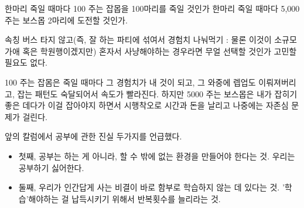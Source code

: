 한마리 죽일 때마다 100 주는 잡몹을 100마리를 죽일 것인가
한마리 죽일 때마다 5,000 주는 보스몹 2마리에 도전할 것인가.
\vspace{5mm}

속칭 버스 타지 않고(즉, 잘 하는 파티에 섞여서 경험치 나눠먹기 : 물론 이것이 소규모 가애 혹은 학원행이겠지만)
혼자서 사냥해야하는 경우라면 무얼 선택할 것인가 고민할 필요도 없다.
\vspace{5mm}

100 주는 잡몸은 죽일 때마다 그 경험치가 내 것이 되고, 그 와중에 렙업도 이뤄져버리고, 잡는 패턴도 숙달되어서 속도가 빨라진다.
하지만 5000 주는 보스몹은 내가 잡히기 좋은 데다가 이걸 잡아야지 하면서 시행착오로 시간과 돈을 날리고 나중에는 자존심 문제가 걸린다.
\vspace{5mm}

앞의 칼럼에서 공부에 관한 진실 두가지를 언급했다.
\begin{itemize}
    \item 첫째, 공부는 하는 게 아니라, 할 수 밖에 없는 환경을 만들어야 한다는 것. 우리는 공부하기 싫어한다.
    \item 둘째, 우리가 인간답게 사는 비결이 바로 함부로 학습하지 않는 데 있다는 것. '학습'해야하는 걸 납득시키기 위해서 반복횟수를 늘리라는 것.
\end{itemize}
\vspace{5mm}

